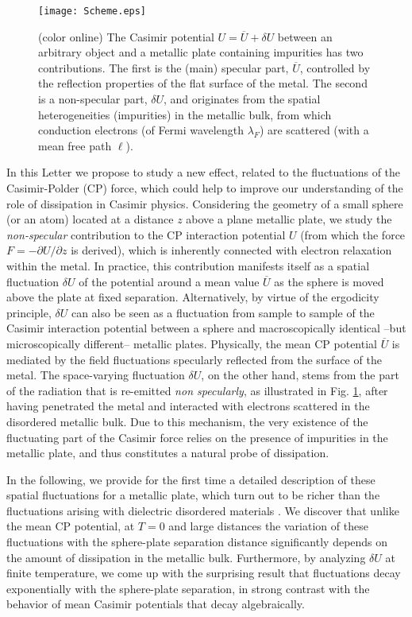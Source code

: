 \documentclass[doublecol]{epl2}
\begin{document}
\begin{figure}
\texttt{[image: Scheme.eps]}
\caption{
\label{illustration}
(color online) The Casimir potential $U=\overline{U}+\delta U$ between an arbitrary object and a metallic plate containing impurities has two contributions. The first is the (main) specular part, $\overline{U}$, controlled by the reflection properties of the flat surface of the metal. The second is a non-specular part, $\delta U$, and originates from the spatial heterogeneities (impurities) in the metallic bulk, from which conduction electrons (of Fermi wavelength $\lambda_F$) are scattered (with a mean free path $\ell$).
}
\end{figure}

In this Letter we propose to study a new effect, related to the fluctuations of the Casimir-Polder (CP) force, which could help to improve our understanding of the role of dissipation in Casimir physics. Considering the geometry of a small sphere (or an atom)  located at a distance $z$ above a plane metallic plate, we study the \textit{non-specular} contribution to the CP interaction potential $U$ (from which the force $F=-\partial U/\partial z$ is derived), which is inherently connected with electron relaxation within the metal. In practice, this contribution manifests itself as a spatial fluctuation $\delta U$ of the potential around a mean value $\overline{U}$ as the sphere is moved above the plate at fixed separation. Alternatively, by virtue of the ergodicity principle, $\delta U$ can also be seen as a fluctuation from sample to sample of the Casimir interaction potential between a sphere and macroscopically identical --but microscopically different-- metallic plates. Physically, the mean CP potential $\overline{U}$ is mediated by the field fluctuations specularly reflected from the surface of the metal. The space-varying fluctuation $\delta U$, on the other hand, stems from the part of the radiation that is re-emitted \textit{non specularly}, as illustrated in Fig. \ref{illustration}, after having penetrated the metal and interacted with electrons scattered in the disordered metallic bulk.
Due to this mechanism, the very existence of the  fluctuating part of the Casimir force relies on the presence of impurities in the metallic plate, and thus constitutes a natural probe of dissipation. 
 

In the following, we provide for the first time a detailed description of these spatial fluctuations for a metallic plate, which turn out to be richer than the fluctuations arising with  dielectric disordered materials \cite{Dean09, Cherroret15, Cherroret15b}. We discover that unlike the mean CP potential, at $T=0$ and large distances the variation of these fluctuations with the sphere-plate separation  distance significantly depends on the amount of dissipation in the metallic bulk. Furthermore, by analyzing $\delta U$ at finite temperature, we come up with the surprising result that fluctuations decay exponentially with the sphere-plate separation, in strong contrast with the behavior of mean Casimir potentials that decay algebraically.
\end{document}
